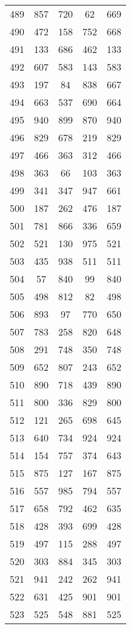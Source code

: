 \documentclass[a4paper,10pt,ngerman]{scrartcl}
\begin{document}
\begin{longtable}[c]{c|c|c|c|c}
    489 & 857 & 720 & 62 & 669 \\
    490 & 472 & 158 & 752 & 668 \\
    491 & 133 & 686 & 462 & 133 \\
    492 & 607 & 583 & 143 & 583 \\
    493 & 197 & 84 & 838 & 667 \\
    494 & 663 & 537 & 690 & 664 \\
    495 & 940 & 899 & 870 & 940 \\
    496 & 829 & 678 & 219 & 829 \\
    497 & 466 & 363 & 312 & 466 \\
    498 & 363 & 66 & 103 & 363 \\
    499 & 341 & 347 & 947 & 661 \\
    500 & 187 & 262 & 476 & 187 \\
    501 & 781 & 866 & 336 & 659 \\
    502 & 521 & 130 & 975 & 521 \\
    503 & 435 & 938 & 511 & 511 \\
    504 & 57 & 840 & 99 & 840 \\
    505 & 498 & 812 & 82 & 498 \\
    506 & 893 & 97 & 770 & 650 \\
    507 & 783 & 258 & 820 & 648 \\
    508 & 291 & 748 & 350 & 748 \\
    509 & 652 & 807 & 243 & 652 \\
    510 & 890 & 718 & 439 & 890 \\
    511 & 800 & 336 & 829 & 800 \\
    512 & 121 & 265 & 698 & 645 \\
    513 & 640 & 734 & 924 & 924 \\
    514 & 154 & 757 & 374 & 643 \\
    515 & 875 & 127 & 167 & 875 \\
    516 & 557 & 985 & 794 & 557 \\
    517 & 658 & 792 & 462 & 635 \\
    518 & 428 & 393 & 699 & 428 \\
    519 & 497 & 115 & 288 & 497 \\
    520 & 303 & 884 & 345 & 303 \\
    521 & 941 & 242 & 262 & 941 \\
    522 & 631 & 425 & 901 & 901 \\
    523 & 525 & 548 & 881 & 525 \\

\end{longtable}
\end{document}
